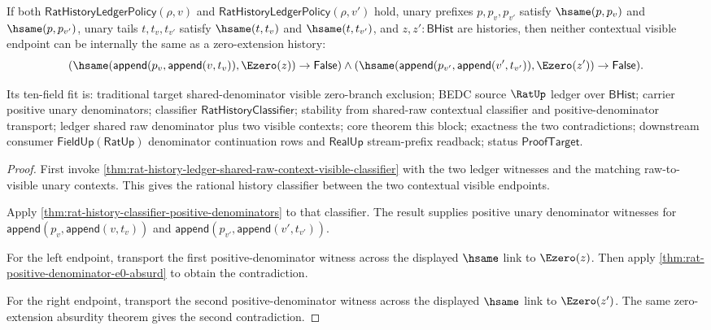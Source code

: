 \begin{theorem}
\label{thm:rat-history-ledger-shared-raw-context-zero-extension-exclusion}
If both $\mathsf{RatHistoryLedgerPolicy}(\rho,v)$ and
$\mathsf{RatHistoryLedgerPolicy}(\rho,v')$ hold, unary prefixes
$p,p_v,p_{v'}$ satisfy $\hsame(p,p_v)$ and $\hsame(p,p_{v'})$, unary tails
$t,t_v,t_{v'}$ satisfy $\hsame(t,t_v)$ and $\hsame(t,t_{v'})$, and
$z,z':\mathsf{BHist}$ are histories, then neither contextual visible endpoint
can be internally the same as a zero-extension history:
$$
(\hsame(\mathsf{append}(p_v,\mathsf{append}(v,t_v)),\Ezero(z))\to
\mathsf{False})\land
(\hsame(\mathsf{append}(p_{v'},\mathsf{append}(v',t_{v'})),\Ezero(z'))\to
\mathsf{False}).
$$

Its ten-field fit is: traditional target shared-denominator visible
zero-branch exclusion; BEDC source $\RatUp$ ledger over $\mathsf{BHist}$;
carrier positive unary denominators; classifier
$\mathsf{RatHistoryClassifier}$; stability from shared-raw contextual
classifier and positive-denominator transport; ledger shared raw denominator
plus two visible contexts; core theorem this block; exactness the two
contradictions; downstream consumer $\mathsf{FieldUp}(\mathsf{RatUp})$
denominator continuation rows and $\mathsf{RealUp}$ stream-prefix readback;
status $\mathsf{ProofTarget}$.
\end{theorem}
\begin{proof}
First invoke
\autoref{thm:rat-history-ledger-shared-raw-context-visible-classifier} with the
two ledger witnesses and the matching raw-to-visible unary contexts. This gives
the rational history classifier between the two contextual visible endpoints.

Apply \autoref{thm:rat-history-classifier-positive-denominators} to that
classifier. The result supplies positive unary denominator witnesses for
$\mathsf{append}(p_v,\mathsf{append}(v,t_v))$ and
$\mathsf{append}(p_{v'},\mathsf{append}(v',t_{v'}))$.

For the left endpoint, transport the first positive-denominator witness across
the displayed $\hsame$ link to $\Ezero(z)$. Then apply
\autoref{thm:rat-positive-denominator-e0-absurd} to obtain the contradiction.

For the right endpoint, transport the second positive-denominator witness
across the displayed $\hsame$ link to $\Ezero(z')$. The same zero-extension
absurdity theorem gives the second contradiction.
\end{proof}

